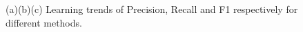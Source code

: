 \begin{figure}[h]
	\centering
	\caption{(a)(b)(c) Learning trends of Precision, Recall and F1 respectively for different methods.}
	\label{fig:learning_curve}
\end{figure}

